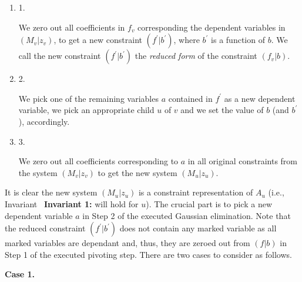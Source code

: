 \documentclass[10pt,a4paper]{article}
\begin{document}
\begin{enumerate}


\item[] 
1. 


We zero out all coefficients in $f_{v}$ corresponding the dependent variables in $(M_{v}|z_{v})$, to get a new constraint $(f^{\prime}|b^{\prime})$, where $b^{\prime}$ is a function of $b$. We call the new constraint $(f^{\prime}|b^{\prime})$ the \emph{reduced form} of the constraint $(f_{v}|b)$.\par





\item[] 
2. 


We pick one of the remaining variables $a$ contained in $f^{\prime}$ as a new dependent variable, we pick an appropriate child $u$ of $v$ and we set the value of $b$ (and $b^{\prime}$), accordingly.\par





\item[] 
3. 


We zero out all coefficients corresponding to $a$ in all original constraints from the system $(M_{v}|z_{v})$ to get the new system $(M_{u}|z_{u})$.\par





\end{enumerate}


It is clear the new system $(M_{u}|z_{u})$ is a constraint representation of $A_{u}$ (i.e., Invariant \textbf{ Invariant 1:} will hold for $u$).
The crucial part is to pick a new dependent variable $a$ in Step 2 of the executed Gaussian elimination.
Note that the reduced constraint $(f^{\prime}|b^{\prime})$ does not contain any marked variable as all marked variables are dependant and, thus, they are zeroed out from $(f|b)$ in Step 1 of the executed pivoting step.
There are two cases to consider as follows.\par




\par\medskip\noindent\textbf{Case 1.}\par
\end{document}
